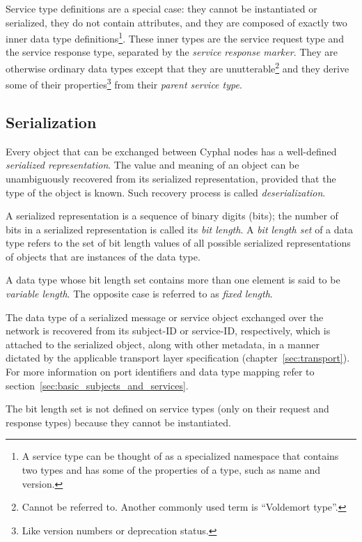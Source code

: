 Service type definitions are a special case:
they cannot be instantiated or serialized, they do not contain attributes,
and they are composed of exactly two inner data type definitions\footnote{
    A service type can be thought of as a specialized namespace that contains two types and
    has some of the properties of a type, such as name and version.
}.
These inner types are the service request type and the service response type,
separated by the \emph{service response marker}.
They are otherwise ordinary data types except that they are unutterable\footnote{%
    Cannot be referred to. Another commonly used term is ``Voldemort type''.
}
and they derive some of their properties\footnote{Like version numbers or deprecation status.}
from their \emph{parent service type}.

\subsection{Serialization}

Every object that can be exchanged between Cyphal nodes has a well-defined \emph{serialized representation}.
The value and meaning of an object can be unambiguously recovered from its serialized representation,
provided that the type of the object is known.
Such recovery process is called \emph{deserialization}.

\label{sec:dsdl_bit_length_set}
A serialized representation is a sequence of binary digits (bits);
the number of bits in a serialized representation is called its \emph{bit length}.
A \emph{bit length set} of a data type refers to the set of bit length values of all possible
serialized representations of objects that are instances of the data type.

A data type whose bit length set contains more than one element is said to be \emph{variable length}.
The opposite case is referred to as \emph{fixed length}.

The data type of a serialized message or service object exchanged over the network
is recovered from its subject-ID or service-ID, respectively,
which is attached to the serialized object, along with other metadata, in a manner dictated by the applicable
transport layer specification (chapter~\ref{sec:transport}).
For more information on port identifiers and data type mapping refer to section~\ref{sec:basic_subjects_and_services}.

The bit length set is not defined on service types (only on their request and response types)
because they cannot be instantiated.
